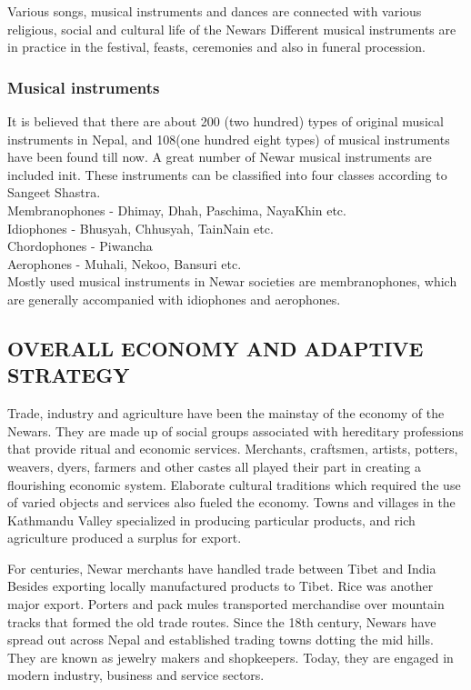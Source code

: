 \documentclass[a4paper,13pt, margin=0.9in]{article}
\begin{document}
\begin{flushleft}
Various songs, musical instruments and dances are connected with various religious, social and cultural life of the Newars Different musical instruments are in practice in the festival, feasts, ceremonies and also in funeral procession.

\subsubsection{Musical instruments}

It is believed that there are about 200 (two hundred) types of original musical instruments in Nepal, and 108(one hundred eight types) of musical instruments have been found till now. A great number of Newar musical instruments are included init. These instruments can be classified into four classes according to Sangeet Shastra.\\

Membranophones - Dhimay, Dhah, Paschima, NayaKhin etc.\\
Idiophones - Bhusyah, Chhusyah, TainNain etc.\\
Chordophones - Piwancha\\
Aerophones - Muhali, Nekoo, Bansuri etc.\\

Mostly used musical instruments in Newar societies are membranophones, which are generally accompanied with idiophones and aerophones.




\newpage
\subsection{OVERALL ECONOMY AND ADAPTIVE STRATEGY}
Trade, industry and agriculture have been the mainstay of the economy of the Newars. They are made up of social groups associated with hereditary professions that provide ritual and economic services. Merchants, craftsmen, artists, potters, weavers, dyers, farmers and other castes all played their part in creating a flourishing economic system. Elaborate cultural traditions which required the use of varied objects and services also fueled the economy. Towns and villages in the Kathmandu Valley specialized in producing particular products, and rich agriculture produced a surplus for export.

For centuries, Newar merchants have handled trade between Tibet and India Besides exporting locally manufactured products to Tibet. Rice was another major export. Porters and pack mules transported merchandise over mountain tracks that formed the old trade routes. Since the 18th century, Newars have spread out across Nepal and established trading towns dotting the mid hills. They are known as jewelry makers and shopkeepers. Today, they are engaged in modern industry, business and service sectors.


\end{flushleft}
\end{document}
